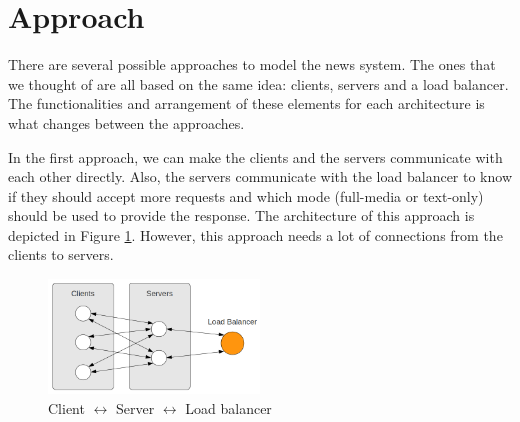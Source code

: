 \documentclass[a4paper]{article}
\begin{document}

%
%
\section{Approach}

There are several possible approaches to model the news system. The ones that we
thought of are all based on the same idea: clients, servers and a load balancer. The
functionalities and arrangement of these elements for each architecture is what
changes between the approaches.

In the first approach, we can make the clients and the servers communicate with
each other
directly. Also, the servers communicate with the load balancer to
know if they should accept more requests and which mode (full-media or
text-only) should be used to provide the response. The architecture of this
approach is depicted in Figure \ref{fig:cslb}. However, this approach needs
a lot of connections from the clients to servers.

\begin{figure}[htb]
	\begin{center}
		\includegraphics[width=0.5\textwidth]{images/c_s_lb.png}
	\end{center}
	\caption{Client $\leftrightarrow$ Server $\leftrightarrow$ Load balancer }
	\label{fig:cslb}
\end{figure}
\end{document}

